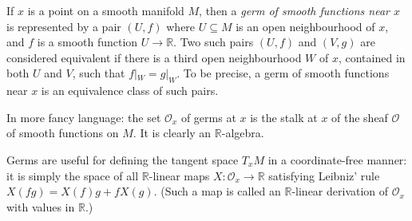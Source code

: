 \documentclass[12pt]{article}
\begin{document}
If $x$ is a point on a smooth manifold $M$, then a {\em germ of smooth functions near $x$} is represented by a pair $(U,f)$ where $U \subseteq M$ is an open neighbourhood of $x$, and $f$ is a smooth function $U \rightarrow \mathbb{R}$. Two such pairs $(U,f)$ and $(V,g)$ are considered equivalent if there is a third open neighbourhood $W$ of $x$, contained in both $U$ and $V$, such that $f|_W=g|_W$. To be precise, a germ of smooth functions near $x$ is an equivalence class of such pairs. 

In more fancy language: the set $\mathcal{O}_x$ of germs at $x$ is the stalk at $x$ of the sheaf $\mathcal{O}$ of smooth functions on $M$. It is clearly an $\mathbb{R}$-algebra.

Germs are useful for defining the tangent space $T_x M$ in a coordinate-free manner: it is simply the space of all $\mathbb{R}$-linear maps $X:\mathcal{O}_x \rightarrow \mathbb{R}$ satisfying Leibniz' rule $X(fg)=X(f)g+fX(g)$. (Such a map is called an $\mathbb{R}$-linear derivation of $\mathcal{O}_x$ with values in $\mathbb{R}$.)
\end{document}

